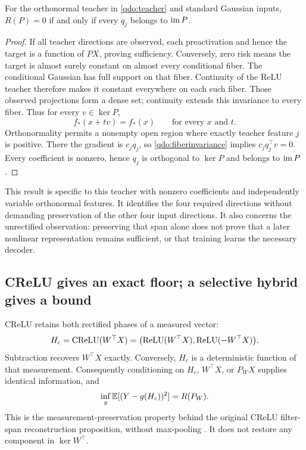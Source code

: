 \begin{proposition}
\label{qdo:spancriterion}
For the orthonormal teacher in \eqref{qdo:teacher} and standard Gaussian
inputs, $R(P)=0$ if and only if every $q_j$ belongs to $\operatorname{im} P$.
\end{proposition}

\begin{proof}
If all teacher directions are observed, each preactivation and hence the
target is a function of $PX$, proving sufficiency. Conversely, zero risk
means the target is almost surely constant on almost every conditional
fiber. The conditional Gaussian has full support on that fiber. Continuity
of the ReLU teacher therefore makes it constant everywhere on each such
fiber. Those observed projections form a dense set; continuity extends this
invariance to every fiber. Thus for every $v\in\ker P$,
\begin{equation}
 f_*(x+t v)=f_*(x)\qquad\text{for every }x\text{ and }t.
 \label{qdo:fiberinvariance}
\end{equation}
Orthonormality permits a nonempty open region where exactly teacher feature
$j$ is positive. There the gradient is $c_jq_j$, so
\eqref{qdo:fiberinvariance} implies $c_jq_j^\top v=0$. Every coefficient is
nonzero, hence $q_j$ is orthogonal to $\ker P$ and belongs to $\operatorname{im} P$.
\end{proof}

This result is specific to this teacher with nonzero coefficients and
independently variable orthonormal features. It identifies the four required
directions without demanding preservation of the other four input
directions. It also concerns the unrectified observation: preserving that
span alone does not prove that a later nonlinear representation remains
sufficient, or that training learns the necessary decoder.

\subsection{CReLU gives an exact floor; a selective hybrid gives a bound}
\label{qdo:crelu}

CReLU retains both rectified phases of a measured vector:
\begin{equation}
 H_c=\operatorname{CReLU}(W^\top X)
 =\bigl(\operatorname{ReLU}(W^\top X),\operatorname{ReLU}(-W^\top X)\bigr).
 \label{qdo:creluobservation}
\end{equation}
Subtraction recovers $W^\top X$ exactly. Conversely, $H_c$ is a deterministic
function of that measurement. Consequently conditioning on $H_c$, $W^\top X$,
or $P_WX$ supplies identical information, and
\begin{equation}
 \inf_g\mathbb E[(Y-g(H_c))^2]=R(P_W).
 \label{qdo:crelufloor}
\end{equation}
This is the measurement-preservation property behind the original CReLU
filter-span reconstruction proposition, without max-pooling \cite{crelu}.
It does not restore any component in $\ker W^\top$.

